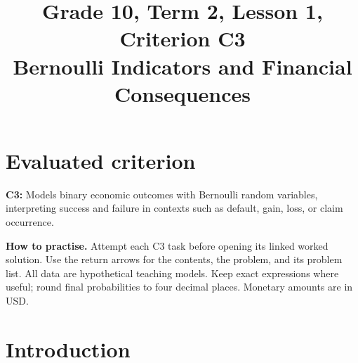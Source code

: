 \makeatletter
{}
\makeatother


\newcommand{\Indicator}[1]{\GTenHLValue{#1}}
\newcommand{\SuccessProb}[1]{\GTenHLProbability{#1}}
\newcommand{\FailureProb}[1]{\GTenHLParameter{#1}}
\newcommand{\Money}[1]{\GTenHLSecond{#1}}
\usepackage{needspace}
\setlength{\emergencystretch}{2em}
\title{Grade 10, Term 2, Lesson 1, Criterion C3\\Bernoulli Indicators and Financial Consequences}
\author{}
\date{}

\maketitle
\setcounter{tocdepth}{1}
\setcounter{secnumdepth}{2}
\label{toc}
\tableofcontents
\section*{Evaluated criterion}
\textbf{C3:} Models binary economic outcomes with Bernoulli random variables, interpreting success and failure in contexts such as default, gain, loss, or claim occurrence.

\textbf{How to practise.} Attempt each C3 task before opening its linked worked solution.
Use the return arrows for the contents, the problem, and its problem list.
All data are hypothetical teaching models. Keep exact expressions where useful;
round final probabilities to four decimal places. Monetary amounts are in USD.

\section{Introduction}\label{sec:t2-c3-introduction}
